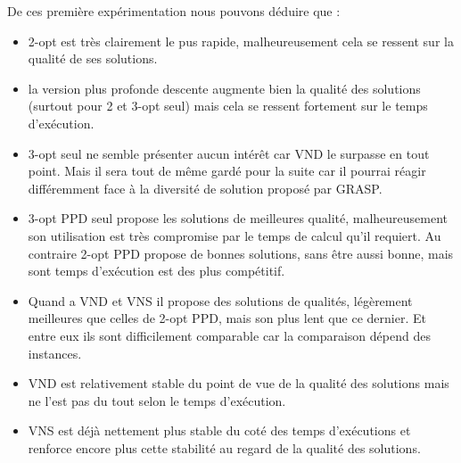 \documentclass[12pt,a4paper]{article}
\begin{document}
De ces première expérimentation nous pouvons déduire que :
\begin{itemize}
\item
2-opt est très clairement le pus rapide, malheureusement cela se ressent sur la qualité de ses solutions.
\item
la version plus profonde descente augmente bien la qualité des solutions (surtout pour 2 et 3-opt seul) mais cela se ressent fortement sur le temps d’exécution.
\item
3-opt seul ne semble présenter aucun intérêt car VND le surpasse en tout point. Mais il sera tout de même gardé pour la suite car il pourrai réagir différemment face à la diversité de solution proposé par GRASP.
\item
3-opt PPD seul propose les solutions de meilleures qualité, malheureusement son utilisation est très compromise par le temps de calcul qu'il requiert. Au contraire 2-opt PPD propose de bonnes solutions, sans être aussi bonne, mais sont temps d’exécution est des plus compétitif.
\item
Quand a VND et VNS il propose des solutions de qualités, légèrement meilleures que celles de 2-opt PPD, mais son plus lent que ce dernier. Et entre eux ils sont difficilement comparable car la comparaison dépend des instances.
\item
VND est relativement stable du point de vue de la qualité des solutions mais ne l'est pas du tout selon le temps d’exécution.
\item
VNS est déjà nettement plus stable du coté des temps d’exécutions et renforce encore plus cette stabilité au regard de la qualité des solutions.
\end{itemize}
\end{document}
